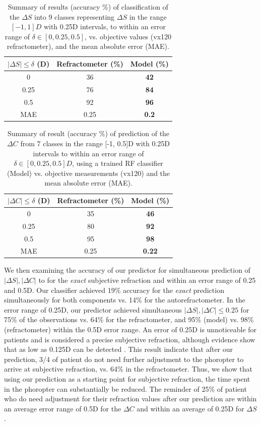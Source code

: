 \documentclass[article,twocolumn,preprint,10pt]{paper}%
\renewcommand{\(}{\left(}
\renewcommand{\)}{\right)}
\renewcommand{\[}{\left[}
\renewcommand{\]}{\right]}
\newcommand{\1}{\mbox{\boldmath$1$}}
\begin{document}
	\begin{table}[http!]
		\begin{tabular}{c|c|c|}
			$|\Delta S|\leq\delta$  (D) & Refractometer (\%) & Model (\%)\\
			\hline    
			0       & 36    & \textbf{42} \\
			0.25  & 76    & \textbf{84} \\
			0.5    & 92    & \textbf{96} \\
			\hline
			MAE  & 0.25 & \textbf{0.2} 
		\end{tabular}
		\caption{Summary of results (accuracy \%) of classification of the $\Delta S$ into 9 classes representing $\Delta S$ in the range $[-1,1]D$ with 0.25D intervals, to within an error range of $\delta\in[0,0.25,0.5]$, vs. objective values (vx120 refractometer), and the mean absolute error (MAE).}
		\label{table:resultsSphereDelta}
	\end{table}
	\begin{table}[h!]
		\begin{tabular}{c|c|c|}
			$|\Delta C|\leq\delta$ (D) & Refractometer (\%) & Model (\%) \\
			\hline 
			0          & 35  &  \textbf{46} \\
			0.25     & 80  & \textbf{92} \\
			0.5       & 95  & \textbf{98} \\
			\hline
			MAE     & 0.25  & \textbf{0.22}
		\end{tabular}
		\caption{Summary of result (accuracy \%) of prediction of the $\Delta C$  from 7  classes in the range [-1, 0.5]D with 0.25D intervals to within an error range of $\delta\in[0,0.25,0.5]D$, using a trained RF classifier (Model) vs. objective measurements (vx120) and the mean absolute error (MAE).}
		\label{table:resultsCylinderDelta}
	\end{table}
	We then examining the accuracy of our predictor for simultaneous prediction of $|\Delta S|,|\Delta C|$ to for the \textit{exact} subjective refraction and within an error range of 0.25 and 0.5D. Our classifier achieved 19\% accuracy for the \textit{exact} prediction simultaneously for both components  vs. 14\% for the autorefractometer. In the error range of 0.25D, our predictor achieved simultaneous $|\Delta S|, |\Delta C|\leq 0.25$ for 75\% of the observations vs. 64\% for the refractometer, and 95\% (model) vs. 98\% (refractometer) within the 0.5D error range.  An  error of 0.25D is unnoticeable for patients and is considered a precise subjective refraction, although evidence show  that as low as 0.125D can be detected \cite{marinrefraction}. This result indicate that after our prediction, 3/4 of patient do not need further adjustment to the phoropter to arrive at subjective refraction, vs. 64\% in the refractometer. Thus, we show that using our prediction as a starting point for subjective refraction, the time spent in the phoropter can substantially be reduced. The reminder of 25\% of patient who do need adjustment for their refraction values after our prediction are within an average error range of 0.5D for the $\Delta C$ and within an average of 0.25D for $\Delta S$. 
\end{document}
